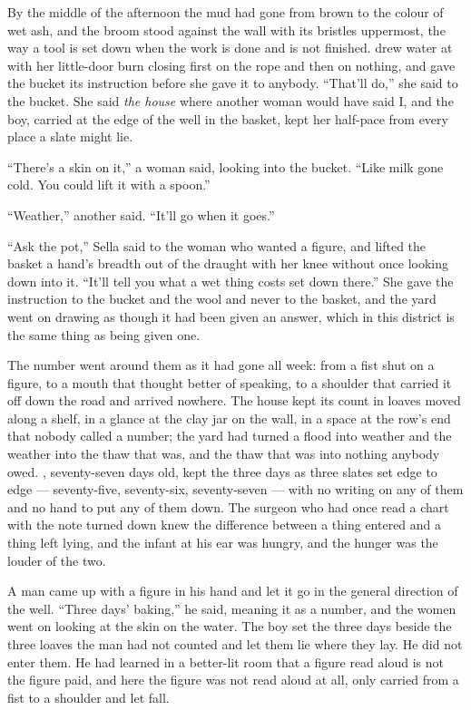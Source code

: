 By the middle of the afternoon the mud had gone from brown to the colour of wet ash, and the broom stood against the wall with its bristles uppermost, the way a tool is set down when the work is done and is not finished.  drew water at  with her little-door burn closing first on the rope and then on nothing, and gave the bucket its instruction before she gave it to anybody. “That'll do,” she said to the bucket. She said \emph{the house} where another woman would have said I, and the boy, carried at the edge of the well in the basket, kept her half-pace from every place a slate might lie.

“There's a skin on it,” a woman said, looking into the bucket. “Like milk gone cold. You could lift it with a spoon.”

“Weather,” another said. “It'll go when it goes.”

“Ask the pot,” Sella said to the woman who wanted a figure, and lifted the basket a hand's breadth out of the draught with her knee without once looking down into it. “It'll tell you what a wet thing costs set down there.” She gave the instruction to the bucket and the wool and never to the basket, and the yard went on drawing as though it had been given an answer, which in this district is the same thing as being given one.

The number went around them as it had gone all week: from a fist shut on a figure, to a mouth that thought better of speaking, to a shoulder that carried it off down the road and arrived nowhere. The house kept its count in loaves moved along a shelf, in a glance at the clay jar on the wall, in a space at the row's end that nobody called a number; the yard had turned a flood into weather and the weather into the thaw that was, and the thaw that was into nothing anybody owed. , seventy-seven days old, kept the three days as three slates set edge to edge --- seventy-five, seventy-six, seventy-seven --- with no writing on any of them and no hand to put any of them down. The surgeon who had once read a chart with the note turned down knew the difference between a thing entered and a thing left lying, and the infant at his ear was hungry, and the hunger was the louder of the two.

A man came up with a figure in his hand and let it go in the general direction of the well. “Three days' baking,” he said, meaning it as a number, and the women went on looking at the skin on the water. The boy set the three days beside the three loaves the man had not counted and let them lie where they lay. He did not enter them. He had learned in a better-lit room that a figure read aloud is not the figure paid, and here the figure was not read aloud at all, only carried from a fist to a shoulder and let fall.

